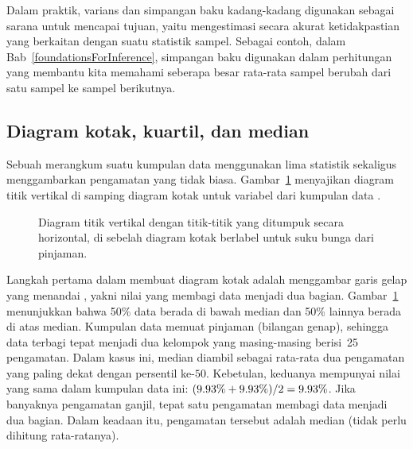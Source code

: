 Dalam praktik, varians dan simpangan baku kadang-kadang digunakan
sebagai sarana untuk mencapai tujuan, yaitu mengestimasi secara
akurat ketidakpastian yang berkaitan dengan suatu statistik sampel.
Sebagai contoh, dalam Bab~\ref{foundationsForInference}, simpangan
baku digunakan dalam perhitungan yang membantu kita memahami
seberapa besar rata-rata sampel berubah dari satu sampel ke sampel
berikutnya.



\subsection{Diagram kotak, kuartil, dan median}

Sebuah  merangkum suatu kumpulan data menggunakan
lima statistik sekaligus menggambarkan pengamatan yang tidak biasa.
Gambar~\ref{loan_int_rate_box_plot_layout} menyajikan diagram titik
vertikal di samping diagram kotak untuk variabel
 dari kumpulan data .

\begin{figure}[h]
  \centering
  \caption{Diagram titik vertikal dengan titik-titik yang
      ditumpuk secara horizontal, di sebelah diagram kotak
      berlabel untuk suku bunga dari \loanN{} pinjaman.}
  \label{loan_int_rate_box_plot_layout}
\end{figure}

Langkah pertama dalam membuat diagram kotak adalah menggambar
garis gelap yang menandai , yakni nilai yang membagi
data menjadi dua bagian.
Gambar~\ref{loan_int_rate_box_plot_layout} menunjukkan bahwa 50\%
data berada di bawah median dan 50\% lainnya berada di atas median.
Kumpulan data memuat \loanN{} pinjaman (bilangan genap), sehingga
data terbagi tepat menjadi dua kelompok yang masing-masing
berisi~25 pengamatan.
Dalam kasus ini, median diambil sebagai rata-rata dua pengamatan
yang paling dekat dengan persentil ke-$50$. Kebetulan, keduanya
mempunyai nilai yang sama dalam kumpulan data ini:
$(\text{9.93\%{}} + \text{9.93\%{}}) / 2
  = \text{9.93\%{}}$.
Jika banyaknya pengamatan ganjil, tepat satu pengamatan membagi
data menjadi dua bagian. Dalam keadaan itu, pengamatan tersebut
adalah median (tidak perlu dihitung rata-ratanya).

